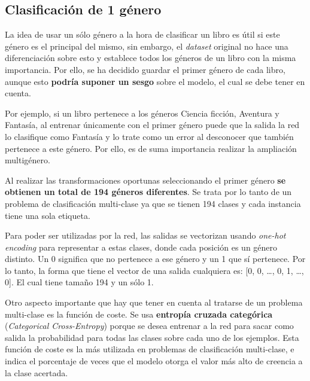 \documentclass[12pt,a4paper, xcolor=table]{article}
\begin{document}
\newpage


\subsection{Clasificación de 1 género}

La idea de usar un sólo género a la hora de clasificar un libro es útil si este género es el principal del mismo, sin embargo, el \textit{dataset} original no hace una diferenciación sobre esto y establece todos los géneros de un libro con la misma importancia. Por ello, se ha decidido guardar el primer género de cada libro, aunque esto \textbf{podría suponer un sesgo }sobre el modelo, el cual se debe tener en cuenta.

\vspace{2mm}

Por ejemplo, si un libro pertenece a los géneros Ciencia ficción, Aventura y Fantasía, al entrenar únicamente con el primer género puede que la salida la red lo clasifique como Fantasía y lo trate como un error al desconocer que también pertenece a este género. Por ello, es de suma importancia realizar la ampliación multigénero.

\vspace{3mm}

Al realizar las transformaciones oportunas seleccionando el primer género \textbf{se obtienen un total de 194 géneros diferentes}. Se trata por lo tanto de un problema de clasificación multi-clase ya que se tienen 194 clases y cada instancia tiene una sola etiqueta.

\vspace{3mm}

Para poder ser utilizadas por la red, las salidas se vectorizan usando \textit{one-hot encoding} para representar a estas clases, donde cada posición es un género distinto. Un 0 significa que no pertenece a ese género y un 1 que sí pertenece. Por lo tanto, la forma que tiene el vector de una salida cualquiera es: [0, 0, …, 0, 1, …, 0]. El cual tiene tamaño 194 y un sólo 1.

\vspace{3mm}

Otro aspecto importante que hay que tener en cuenta al tratarse de un problema multi-clase es la función de coste. Se usa \textbf{entropía cruzada categórica} (\textit{Categorical Cross-Entropy}) porque se desea entrenar a la red para sacar como salida la probabilidad para todas las clases sobre cada uno de los ejemplos. Esta función de coste es la más utilizada en problemas de clasificación multi-clase, e indica el porcentaje de veces que el modelo otorga el valor más alto de creencia a la clase acertada.
\end{document}
